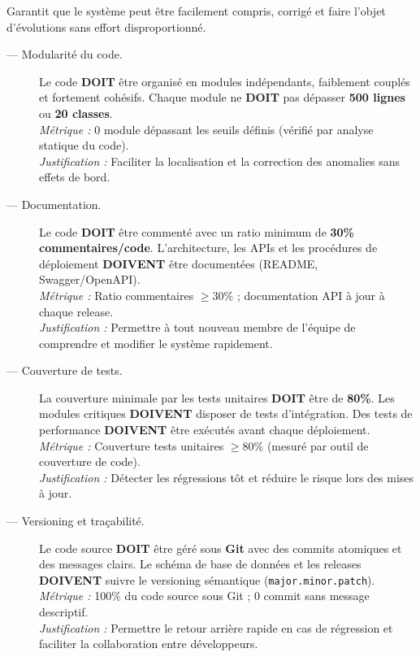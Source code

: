  Garantit que le système peut être facilement compris,
corrigé et faire l'objet d'évolutions sans effort disproportionné.

\begin{description}

    \item[ — Modularité du code.]
    Le code \textbf{DOIT} être organisé en modules indépendants, faiblement
    couplés et fortement cohésifs. Chaque module ne \textbf{DOIT} pas
    dépasser \textbf{500 lignes} ou \textbf{20 classes}.\\
    \textit{Métrique :} 0 module dépassant les seuils définis
    (vérifié par analyse statique du code).\\
    \textit{Justification :} Faciliter la localisation et la correction
    des anomalies sans effets de bord.

    \item[ — Documentation.]
    Le code \textbf{DOIT} être commenté avec un ratio minimum de
    \textbf{30\% commentaires/code}. L'architecture, les APIs et les
    procédures de déploiement \textbf{DOIVENT} être documentées
    (README, Swagger/OpenAPI).\\
    \textit{Métrique :} Ratio commentaires $\geq 30\%$ ;
    documentation API à jour à chaque release.\\
    \textit{Justification :} Permettre à tout nouveau membre de l'équipe
    de comprendre et modifier le système rapidement.

    \item[ — Couverture de tests.]
    La couverture minimale par les tests unitaires \textbf{DOIT} être de
    \textbf{80\%}. Les modules critiques \textbf{DOIVENT} disposer de tests
    d'intégration. Des tests de performance \textbf{DOIVENT} être exécutés
    avant chaque déploiement.\\
    \textit{Métrique :} Couverture tests unitaires $\geq 80\%$
    (mesuré par outil de couverture de code).\\
    \textit{Justification :} Détecter les régressions tôt et réduire
    le risque lors des mises à jour.

    \item[ — Versioning et traçabilité.]
    Le code source \textbf{DOIT} être géré sous \textbf{Git} avec des
    commits atomiques et des messages clairs. Le schéma de base de données
    et les releases \textbf{DOIVENT} suivre le versioning sémantique
    (\texttt{major.minor.patch}).\\
    \textit{Métrique :} 100\% du code source sous Git ;
    0 commit sans message descriptif.\\
    \textit{Justification :} Permettre le retour arrière rapide en cas
    de régression et faciliter la collaboration entre développeurs.

\end{description}

